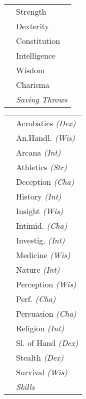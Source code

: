 \documentclass{article}
\begin{document}
\begin{minipage}{.3\textwidth}
\begin{minipage}{.58\textwidth}
\begin{tabularx}{\textwidth}{| L{.05} L{1.95} |}
    \end{tabularx}
    \begin{tabularx}{\textwidth}{| L{.05} L{1.95} |}
      \hline
      &Strength\\
      &Dexterity\\
      &Constitution\\
      &Intelligence\\
      &Wisdom\\
      &Charisma\\
      &\textit{\footnotesize{Saving Throws}}\\\hline
    \end{tabularx}
    \begin{tabularx}{\textwidth}{| L{.05} L{1.95} |}
      \hline
      &\footnotesize{Acrobatics} \textit{\scriptsize{(Dex)}}\\
      &\footnotesize{An.Handl.} \textit{\scriptsize{(Wis)}}\\
      &\footnotesize{Arcana} \textit{\scriptsize{(Int)}}\\
      &\footnotesize{Athletics} \textit{\scriptsize{(Str)}}\\
      &\footnotesize{Deception} \textit{\scriptsize{(Cha)}}\\
      &\footnotesize{History} \textit{\scriptsize{(Int)}}\\
      &\footnotesize{Insight} \textit{\scriptsize{(Wis)}}\\
      &\footnotesize{Intimid.} \textit{\scriptsize{(Cha)}}\\
      &\footnotesize{Investig.} \textit{\scriptsize{(Int)}}\\
      &\footnotesize{Medicine} \textit{\scriptsize{(Wis)}}\\
      &\footnotesize{Nature} \textit{\scriptsize{(Int)}}\\
      &\footnotesize{Perception} \textit{\scriptsize{(Wis)}}\\
      &\footnotesize{Perf.} \textit{\scriptsize{(Cha)}}\\
      &\footnotesize{Persuasion} \textit{\scriptsize{(Cha)}}\\
      &\footnotesize{Religion} \textit{\scriptsize{(Int)}}\\
      &\footnotesize{Sl. of Hand} \textit{\scriptsize{(Dex)}}\\
      &\footnotesize{Stealth} \textit{\scriptsize{(Dex)}}\\
      &\footnotesize{Survival} \textit{\scriptsize{(Wis)}}\\
      &\textit{\footnotesize{Skills}}\\\hline

\end{tabularx}
\end{minipage}
\end{minipage}
\end{document}
